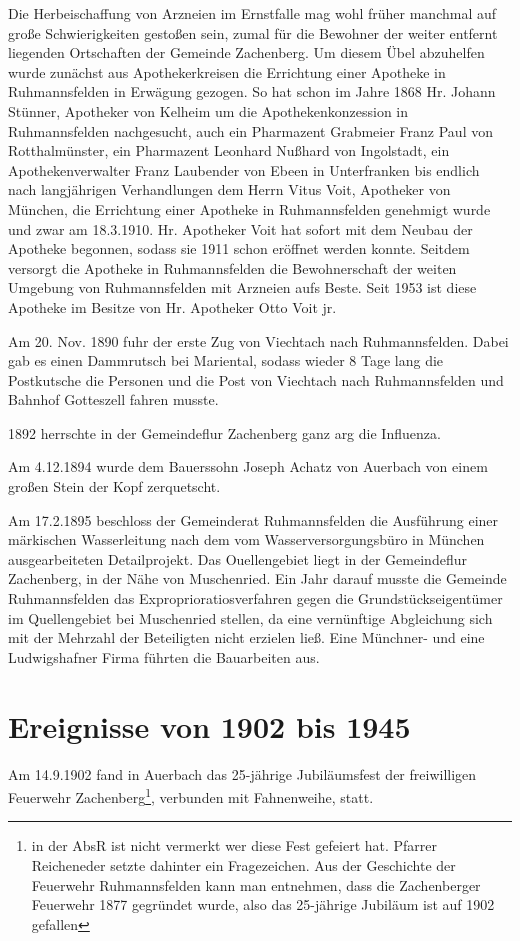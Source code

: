 \documentclass{book}
\begin{document}
Die Herbeischaffung von Arzneien im Ernstfalle mag wohl früher manchmal
auf große Schwierigkeiten gestoßen sein, zumal für die Bewohner der
weiter entfernt liegenden Ortschaften der Gemeinde Zachenberg. Um diesem
Übel abzuhelfen wurde zunächst aus Apothekerkreisen die Errichtung einer
Apotheke in Ruhmannsfelden in Erwägung gezogen. So hat schon im Jahre
1868 Hr. Johann Stünner, Apotheker von Kelheim um die
Apothekenkonzession in Ruhmannsfelden nachgesucht, auch ein Pharmazent
Grabmeier Franz Paul von Rotthalmünster, ein Pharmazent Leonhard Nußhard
von Ingolstadt, ein Apothekenverwalter Franz Laubender von Ebeen in
Unterfranken bis endlich nach langjährigen Verhandlungen dem Herrn Vitus
Voit, Apotheker von München, die Errichtung einer Apotheke in
Ruhmannsfelden genehmigt wurde und zwar am 18.3.1910. Hr. Apotheker Voit
hat sofort mit dem Neubau der Apotheke begonnen, sodass sie 1911 schon
eröffnet werden konnte. Seitdem versorgt die Apotheke in Ruhmannsfelden
die Bewohnerschaft der weiten Umgebung von Ruhmannsfelden mit Arzneien
aufs Beste. Seit 1953 ist diese Apotheke im Besitze von Hr. Apotheker
Otto Voit jr.

Am 20. Nov. 1890 fuhr der erste Zug von Viechtach nach Ruhmannsfelden.
Dabei gab es einen Dammrutsch bei Mariental, sodass wieder 8 Tage lang
die Postkutsche die Personen und die Post von Viechtach nach
Ruhmannsfelden und Bahnhof Gotteszell fahren musste.

1892 herrschte in der Gemeindeflur Zachenberg ganz arg die Influenza.

Am 4.12.1894 wurde dem Bauerssohn Joseph Achatz von Auerbach von einem
großen Stein der Kopf zerquetscht.

Am 17.2.1895 beschloss der Gemeinderat Ruhmannsfelden die Ausführung
einer märkischen Wasserleitung nach dem vom Wasserversorgungsbüro in
München ausgearbeiteten Detailprojekt. Das Ouellengebiet liegt in der
Gemeindeflur Zachenberg, in der Nähe von Muschenried. Ein Jahr darauf
musste die Gemeinde Ruhmannsfelden das Exproprioratiosverfahren gegen
die Grundstückseigentümer im Quellengebiet bei Muschenried stellen, da
eine vernünftige Abgleichung sich mit der Mehrzahl der Beteiligten nicht
erzielen ließ. Eine Münchner- und eine Ludwigshafner Firma führten die
Bauarbeiten aus.

\section{Ereignisse von 1902 bis 1945}

Am 14.9.1902 fand in Auerbach das 25-jährige Jubiläumsfest der
freiwilligen Feuerwehr Zachenberg\footnote{in der AbsR ist nicht
vermerkt wer diese Fest gefeiert hat. Pfarrer Reicheneder setzte
dahinter ein Fragezeichen. Aus der Geschichte der Feuerwehr
Ruhmannsfelden kann man entnehmen, dass die Zachenberger Feuerwehr 1877
gegründet wurde, also das 25-jährige Jubiläum ist auf 1902 gefallen},
verbunden mit Fahnenweihe, statt.
\end{document}
